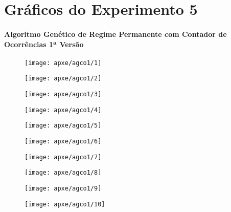 \chapter{Gráficos do Experimento 5}

\subsubsection{Algoritmo Genético de Regime Permanente com Contador de Ocorrências 1ª Versão}

\begin{figure}[H]
\centering

\texttt{[image: apxe/agco1/1]}

\end{figure}

\begin{figure}[H]
\centering

\texttt{[image: apxe/agco1/2]}

\end{figure}

\begin{figure}[H]
\centering

\texttt{[image: apxe/agco1/3]}

\end{figure}
\begin{figure}[H]
\centering

\texttt{[image: apxe/agco1/4]}

\end{figure}
\begin{figure}[H]
\centering

\texttt{[image: apxe/agco1/5]}

\end{figure}
\begin{figure}[H]
\centering

\texttt{[image: apxe/agco1/6]}

\end{figure}
\begin{figure}[H]
\centering

\texttt{[image: apxe/agco1/7]}

\end{figure}
\begin{figure}[H]
\centering

\texttt{[image: apxe/agco1/8]}

\end{figure}
\begin{figure}[H]
\centering

\texttt{[image: apxe/agco1/9]}

\end{figure}
\begin{figure}[H]
\centering

\texttt{[image: apxe/agco1/10]}

\end{figure}

